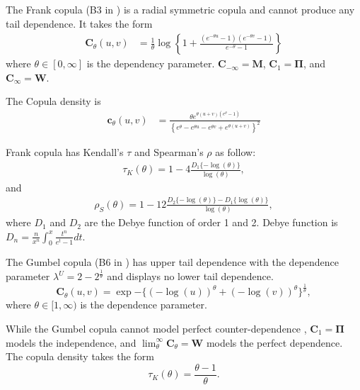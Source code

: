 The Frank copula (B3 in \citet{joe1997multivariate}) is a radial symmetric copula and cannot produce any tail dependence.
It takes the form
\begin{align*}
    \bm{C}_{\theta}(u,v) &= \frac{1}{\theta}
    \log \left\{
    1 + \frac{(e^{-\theta u}-1)(e^{-\theta v}-1)}{e^{-\theta}-1}
    \right\}
    \end{align*}
where $\theta \in [0, \infty]$ is the dependency parameter.
$\bm{C}_{-\infty} = \bm{M}$, $\bm{C}_1 = \bm{\Pi}$, and $\bm{C}_\infty = \bm{W}$.

The Copula density is
\begin{align}
    \bm{c}_{\theta}(u,v) &= \frac{\theta e^{\theta(u+v)(e^\theta-1)}}
    {\left\{e^\theta-e^{\theta u}-e^{\theta v}+e^{\theta (u+v)}\right\}^2}
    \end{align}\medskip

Frank copula has Kendall's $\tau$ and Spearman's $\rho$ as follow:
\begin{align}
    \tau_K(\theta) = 1-4\frac{D_1\{-\log(\theta)\}}{\log(\theta)},
    \end{align}
and
\begin{align}
    \rho_S(\theta) = 1-12\frac{D_2\{-\log(\theta)\} - D_1\{\log(\theta)\}}{\log(\theta)},
    \end{align}
where $D_1$ and $D_2$ are the Debye function of order 1 and 2.
Debye function is $D_n = \frac{n}{x^n}\int_0^x\frac{t^n}{e^t-1}dt$.\medskip

The Gumbel copula (B6 in \citet{joe1997multivariate}) has upper tail
dependence with the dependence parameter $\lambda^U =
2-2^{\frac{1}{\theta}}$ and displays no lower tail dependence. 
\begin{equation*}
  \bm{C}_{\theta}(u,v) = \exp{-\{ (-\log(u))^\theta +(-\log(v))^\theta 
    \}^{\frac{1}{\theta}}},
\end{equation*}
where $\theta \in [1,\infty)$ is the dependence parameter.
    
While the Gumbel copula cannot model perfect counter-dependence
\citep{Nelsen2002}, $\bm{C}_{1} = \bm{\Pi}$ models the independence, 
and $\lim_\theta^\infty \bm{C}_\theta = \bm{W}$ models the perfect
dependence. The copula density takes the form
  \begin{equation*}
    \tau_K(\theta) =\frac{\theta-1}{\theta}. 
   \end{equation*}

